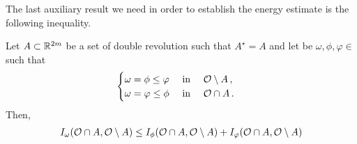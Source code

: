 The last auxiliary result we need in order to establish the energy estimate is the following inequality.

\begin{lemma}
\label{Lemma: InteractionInequalityMinimumFunction}
Let $A\subset\mathbb{R}^{2m}$ be a set of double revolution such that $A^\star = A$ and let be $\omega, \phi, \varphi \in $ such that
$$\begin{cases}
\omega = \phi \leq \varphi \ \ \ \ \textrm{in } \ \ \ \mathcal{O} \setminus A\,,\\
\omega = \varphi \leq \phi \ \ \ \ \textrm{in } \ \ \ \mathcal{O} \cap A\,.
\end{cases}$$
Then,
\begin{align*}
I_\omega(\mathcal{O}\cap A, \mathcal{O} \setminus A) \leq I_\phi(\mathcal{O}\cap A, \mathcal{O} \setminus A) + I_\varphi(\mathcal{O}\cap A, \mathcal{O} \setminus A)
\end{align*}
\end{lemma}


